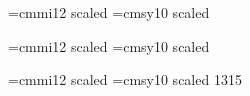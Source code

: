 \begin{\parsearg\beginxxx}
\setfont\chaprm{}
\setfont\chapit{}
\setfont\chapsl{}
\setfont\chaptt{}
\setfont\chapttsl{}
\setfont\chapsf{}
\let\chapbf=\chaprm
\setfont\chapsc{}
\font\chapi=cmmi12 scaled 
\font\chapsy=cmsy10 scaled 

\setfont\secrm{}
\setfont\secit{}
\setfont\secsl{}
\setfont\sectt{}
\setfont\secttsl{}
\setfont\secsf{}
\let\secbf\secrm
\setfont\secsc{}
\font\seci=cmmi12 scaled 
\font\secsy=cmsy10 scaled 




\setfont\ssecrm{}
\setfont\ssecit{}
\setfont\ssecsl{}
\setfont\ssectt{}
\setfont\ssecttsl{}
\setfont\ssecsf{}
\let\ssecbf\ssecrm
\setfont\ssecsc{}
\font\sseci=cmmi12 scaled \magstephalf
\font\ssecsy=cmsy10 scaled 1315

%
\def\resetmathfonts{%
  \textfont0 = \tenrm \textfont1 = \teni \textfont2 = \tensy
  \textfont\itfam = \tenit \textfont\slfam = \tensl \textfont\bffam = \tenbf
  \textfont\ttfam = \tentt \textfont\sffam = \tensf
}



\end{\parsearg\beginxxx}
